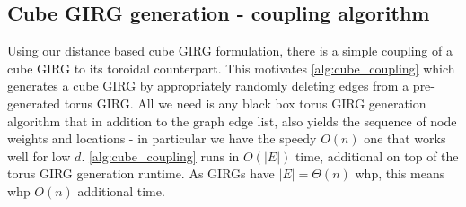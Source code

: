 

\subsection{Cube GIRG generation - coupling algorithm}
Using our distance based cube GIRG formulation, there is a simple coupling of a cube GIRG to its toroidal counterpart. This motivates \cref{alg:cube_coupling} which generates a cube GIRG by appropriately randomly deleting edges from a pre-generated torus GIRG.
All we need is any black box torus GIRG generation algorithm that in addition to the graph edge list, also yields the sequence of node weights and locations - in particular we have the \cite{blasius2022efficiently} speedy $O(n)$ one that works well for low $d$. \cref{alg:cube_coupling} runs in $O(|E|)$ time, additional on top of the torus GIRG generation runtime. As GIRGs have $|E| = \Theta(n)$ whp, this means whp $O(n)$ additional time.


